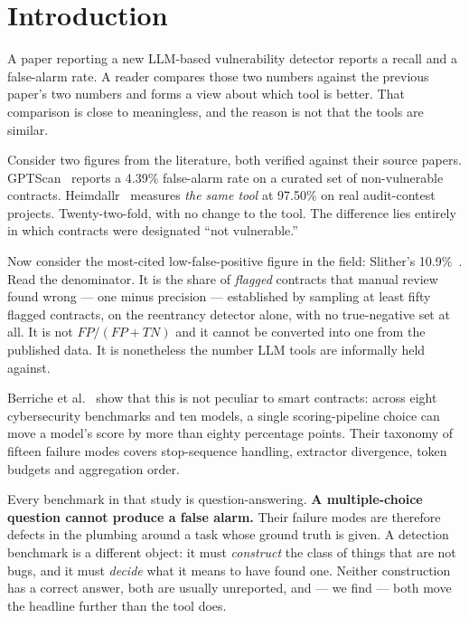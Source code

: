\documentclass[sigconf,nonacm]{acmart}
\begin{document}

\maketitle

\section{Introduction}

A paper reporting a new LLM-based vulnerability detector reports a recall and a
false-alarm rate. A reader compares those two numbers against the previous
paper's two numbers and forms a view about which tool is better. That comparison
is close to meaningless, and the reason is not that the tools are similar.

Consider two figures from the literature, both verified against their source
papers. GPTScan~\cite{gptscan} reports a 4.39\% false-alarm rate on a curated set
of non-vulnerable contracts. Heimdallr~\cite{heimdallr} measures \emph{the same
tool} at 97.50\% on real audit-contest projects. Twenty-two-fold, with no change
to the tool. The difference lies entirely in which contracts were designated
``not vulnerable.''

Now consider the most-cited low-false-positive figure in the field:
Slither's 10.9\%~\cite{slither}. Read the denominator. It is the share of
\emph{flagged} contracts that manual review found wrong --- one minus precision
--- established by sampling at least fifty flagged contracts, on the reentrancy
detector alone, with no true-negative set at all. It is not $FP/(FP+TN)$ and it
cannot be converted into one from the published data. It is nonetheless the
number LLM tools are informally held against.

Berriche et al.~\cite{berriche} show that this is not peculiar to smart
contracts: across eight cybersecurity benchmarks and ten models, a single
scoring-pipeline choice can move a model's score by more than eighty percentage
points. Their taxonomy of fifteen failure modes covers stop-sequence handling,
extractor divergence, token budgets and aggregation order.

Every benchmark in that study is question-answering. \textbf{A multiple-choice
question cannot produce a false alarm.} Their failure modes are therefore defects
in the plumbing around a task whose ground truth is given. A detection benchmark
is a different object: it must \emph{construct} the class of things that are not
bugs, and it must \emph{decide} what it means to have found one. Neither
construction has a correct answer, both are usually unreported, and --- we find
--- both move the headline further than the tool does.
\end{document}

